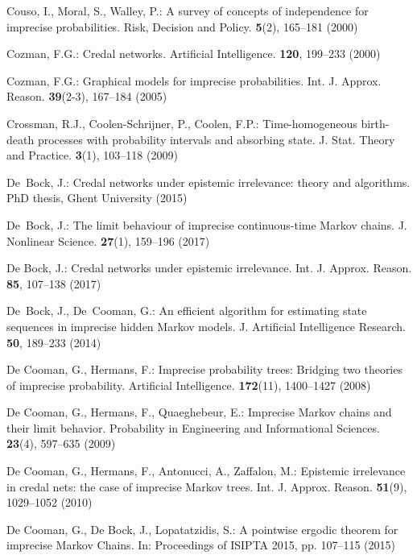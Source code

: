 \begin{thebibliography}{99.}
 Couso, I., Moral, S., Walley, P.: {A survey of concepts of independence for imprecise probabilities}. Risk, Decision and Policy. \textbf{5}(2), 165--181 (2000)

Cozman, F.G.: {Credal networks}. Artificial Intelligence. \textbf{120}, 199--233 (2000)

Cozman, F.G.: {Graphical models for imprecise probabilities}.
Int. J. Approx. Reason. \textbf{39}(2-3), 167--184 (2005)


Crossman, R.J., Coolen-Schrijner, P., Coolen, F.P.: {Time-homogeneous birth-death processes with probability intervals and absorbing state}. J. Stat. Theory and Practice. \textbf{3}(1), 103--118 (2009)



De~Bock, J.: {Credal networks under epistemic irrelevance: theory and
  algorithms}. PhD thesis, Ghent University (2015)

De~Bock, J.: {The limit behaviour of imprecise continuous-time Markov chains}. J. Nonlinear Science. \textbf{27}(1), 159--196 (2017)

De Bock, J.: {Credal networks under epistemic irrelevance}. Int. J. Approx. Reason. \textbf{85}, 107--138 (2017)

De~Bock, J., De~Cooman, G.: {An efficient algorithm for estimating state sequences in imprecise hidden Markov models}. J. Artificial Intelligence Research. \textbf{50}, 189--233 (2014)

De Cooman, G., Hermans, F.: {Imprecise probability trees: Bridging two
theories of imprecise probability}. Artificial Intelligence. \textbf{172}(11), 1400--1427 (2008)

De Cooman, G., Hermans, F., Quaeghebeur, E.: {Imprecise Markov chains and their limit behavior}. Probability in Engineering and Informational Sciences. \textbf{23}(4), 597--635 (2009)

De Cooman, G., Hermans, F., Antonucci, A., Zaffalon, M.: {Epistemic irrelevance in credal nets: the case of imprecise Markov trees}. Int. J. Approx. Reason. \textbf{51}(9), 1029--1052 (2010)

De Cooman, G., De Bock, J., Lopatatzidis, S.: {A pointwise ergodic theorem for imprecise Markov Chains}. In: Proceedings of ISIPTA 2015, pp. 107--115 (2015) 


\end{thebibliography}
